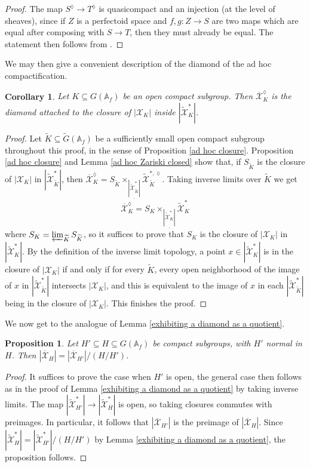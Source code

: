 \documentclass{amsart}
\newtheorem{cor}[subsubsection]{Corollary}
\newtheorem{prop}[subsubsection]{Proposition}
\theoremstyle{remark}
\numberwithin{equation}{subsection}
\newcommand{\A}{\AA}
\renewcommand{\AA}{{\mathbb A}}
\newcommand{\cX}{{\mathcal X}}
\newcommand{\tG}{\widetilde{G}}
\newcommand{\tK}{{\widetilde{K}}}
\newcommand{\tcX}{\widetilde{\mathcal{X}}}
\newcommand{\ocX}{\overline{\mathcal{X}}}
\newcommand{\ul}{\underline}
\newcommand{\sub}{\subseteq}
\renewcommand{\(}{\left(}
\renewcommand{\)}{\right)}
\begin{document}
\begin{proof}
The map $S^\lozenge \to T^\lozenge$ is quasicompact and an injection (at the level of sheaves), since if $Z$ is a perfectoid space and $f,g : Z \to S$ are two maps which are equal after composing with $S \to T$, then they must already be equal. The statement then follows from \cite[Proposition 11.20]{diamonds}.
\end{proof}

We may then give a convenient description of the diamond of the ad hoc compactification.

\begin{cor}\label{ad hoc description of diamond}
Let $K \sub G(\A_f)$ be an open compact subgroup. Then $\ocX^\lozenge_K$ is the diamond attached to the closure of $|\cX_K|$ inside $|\tcX_K^\ast|$. 
\end{cor}

\begin{proof}
Let $\tK \sub \tG(\A_f)$ be a sufficiently small open compact subgroup throughout this proof, in the sense of Proposition \ref{ad hoc closure}. Proposition \ref{ad hoc closure} and Lemma \ref{ad hoc Zariski closed} show that, if $S_{\tK}$ is the closure of $|\cX_K|$ in $|\tcX_\tK^\ast|$, then $\ocX_K^\lozenge = S_{\tK} \times_{\ul{|\tcX_\tK^\ast|}}\tcX_\tK^{\ast,\lozenge}$. Taking inverse limits over $\tK$ we get
\[
\ocX_K^\lozenge = S_K \times_{\ul{|\tcX_K^\ast|}}\tcX_K^{\ast}
\]
where $S_K = \varprojlim_{\tK}S_\tK$, so it suffices to prove that $S_K$ is the closure of $|\cX_K|$ in $|\tcX_K^\ast|$. By the definition of the inverse limit topology, a point $x \in 
|\tcX_K^*|$ is in the closure of $|\cX_K|$ if and only if for every 
$\tK$, every open neighborhood of the image of $x$ in 
$|\tcX_{\tK}^*|$ intersects $|\cX_K|$, and this is equivalent to the image of $x$ in each $|\tcX_{\tK}^*|$ being in the closure of $|\cX_K|$. This finishes the proof.
\end{proof}

We now get to the analogue of Lemma \ref{exhibiting a diamond as a quotient}.

\begin{prop}\label{ad hoc exhibiting a diamond as a quotient}
Let $H'\sub H \sub G(\A_f)$ be compact subgroups, with $H'$ normal in $H$. Then $|\ocX_H| = |\ocX_{H'}|/(H/H')$.
\end{prop}

\begin{proof}
It suffices to prove the case when $H'$ is open, the general case then follows as in the proof of Lemma \ref{exhibiting a diamond as a quotient} by taking inverse limits. The map $|\tcX^\ast_{H'}| \to |\tcX^\ast_H|$ is open, so taking closures commutes with preimages. In particular, it follows that $|\ocX_{H'}|$ is the preimage of $|\ocX_H|$. Since $|\tcX^\ast_H| = |\tcX^\ast_{H'}|/(H/H')$ by Lemma \ref{exhibiting a diamond as a quotient}, the proposition follows.
\end{proof}
\end{document}
